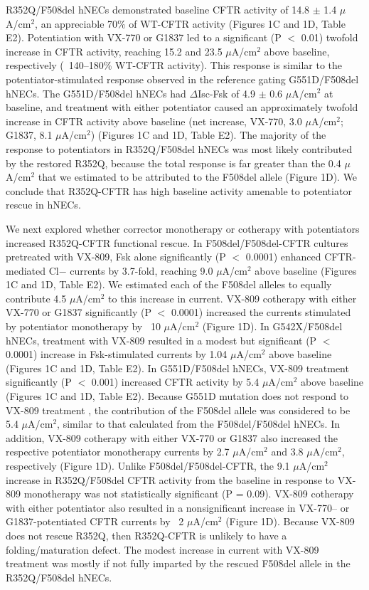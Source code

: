 R352Q/F508del hNECs demonstrated baseline CFTR activity of 14.8 $\pm$ 1.4 $\mu$A/cm$^2$, an appreciable 70\% of WT-CFTR activity (Figures 1C and 1D, Table E2). Potentiation with VX-770 or G1837 led to a significant (P $<$ 0.01) twofold increase in CFTR activity, reaching 15.2 and 23.5 $\mu$A/cm$^2$ above baseline, respectively (~140–180\% WT-CFTR activity). This response is similar to the potentiator-stimulated response observed in the reference gating G551D/F508del hNECs. The G551D/F508del hNECs had $\Delta$Isc-Fsk of 4.9 $\pm$ 0.6 $\mu$A/cm$^2$ at baseline, and treatment with either potentiator caused an approximately twofold increase in CFTR activity above baseline (net increase, VX-770, 3.0 $\mu$A/cm$^2$; G1837, 8.1 $\mu$A/cm$^2$) (Figures 1C and 1D, Table E2). The majority of the response to potentiators in R352Q/F508del hNECs was most likely contributed by the restored R352Q, because the total response is far greater than the 0.4 $\mu$A/cm$^2$ that we estimated to be attributed to the F508del allele (Figure 1D). We conclude that R352Q-CFTR has high baseline activity amenable to potentiator rescue in hNECs.

We next explored whether corrector monotherapy or cotherapy with potentiators increased R352Q-CFTR functional rescue. In F508del/F508del-CFTR cultures pretreated with VX-809, Fsk alone significantly (P $<$ 0.0001) enhanced CFTR-mediated Cl− currents by 3.7-fold, reaching 9.0 $\mu$A/cm$^2$ above baseline (Figures 1C and 1D, Table E2). We estimated each of the F508del alleles to equally contribute 4.5 $\mu$A/cm$^2$ to this increase in current. VX-809 cotherapy with either VX-770 or G1837 significantly (P $<$ 0.0001) increased the currents stimulated by potentiator monotherapy by ~10 $\mu$A/cm$^2$ (Figure 1D). In G542X/F508del hNECs, treatment with VX-809 resulted in a modest but significant (P $<$ 0.0001) increase in Fsk-stimulated currents by 1.04 $\mu$A/cm$^2$ above baseline (Figures 1C and 1D, Table E2). In G551D/F508del hNECs, VX-809 treatment significantly (P $<$ 0.001) increased CFTR activity by 5.4 $\mu$A/cm$^2$ above baseline (Figures 1C and 1D, Table E2). Because G551D mutation does not respond to VX-809 treatment \cite{han2018}, the contribution of the F508del allele was considered to be 5.4 $\mu$A/cm$^2$, similar to that calculated from the F508del/F508del hNECs. In addition, VX-809 cotherapy with either VX-770 or G1837 also increased the respective potentiator monotherapy currents by 2.7 $\mu$A/cm$^2$ and 3.8 $\mu$A/cm$^2$, respectively (Figure 1D). Unlike F508del/F508del-CFTR, the 9.1 $\mu$A/cm$^2$ increase in R352Q/F508del CFTR activity from the baseline in response to VX-809 monotherapy was not statistically significant (P = 0.09). VX-809 cotherapy with either potentiator also resulted in a nonsignificant increase in VX-770– or G1837-potentiated CFTR currents by ~2 $\mu$A/cm$^2$ (Figure 1D). Because VX-809 does not rescue R352Q, then R352Q-CFTR is unlikely to have a folding/maturation defect. The modest increase in current with VX-809 treatment was mostly if not fully imparted by the rescued F508del allele in the R352Q/F508del hNECs.

